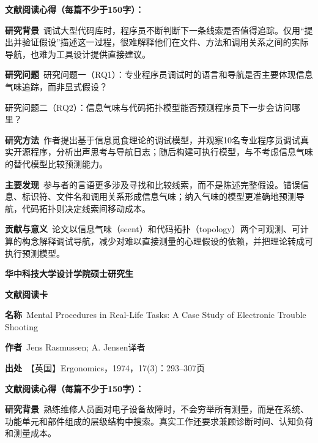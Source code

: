 \vspace{0.35em}
\noindent\textbf{文献阅读心得（每篇不少于150字）：}\par
\noindent\textbf{研究背景}\ 调试大型代码库时，程序员不断判断下一条线索是否值得追踪。仅用“提出并验证假设”描述这一过程，很难解释他们在文件、方法和调用关系之间的实际导航，也难为工具设计提供直接建议。\par
\noindent\textbf{研究问题}\ 研究问题一（RQ1）：专业程序员调试时的语言和导航是否主要体现信息气味追踪，而非显式假设？\par
研究问题二（RQ2）：信息气味与代码拓扑模型能否预测程序员下一步会访问哪里？\par
\noindent\textbf{研究方法}\ 作者提出基于信息觅食理论的调试模型，并观察10名专业程序员调试真实开源程序，分析出声思考与导航日志；随后构建可执行模型，与不考虑信息气味的替代模型比较预测能力。\par
\noindent\textbf{主要发现}\ 参与者的言语更多涉及寻找和比较线索，而不是陈述完整假设。错误信息、标识符、文件名和调用关系形成信息气味；纳入气味的模型更准确地预测导航，代码拓扑则决定线索间移动成本。\par
\noindent\textbf{贡献与意义}\ 论文以信息气味（scent）和代码拓扑（topology）两个可观测、可计算的构念解释调试导航，减少对难以直接测量的心理假设的依赖，并把理论转成可执行预测模型。\par
\clearpage
\begin{center}
{\songti\bfseries\fontsize{18.5pt}{27.75pt}\selectfont 华中科技大学设计学院硕士研究生\par}
{\songti\bfseries\fontsize{18.5pt}{27.75pt}\selectfont 文献阅读卡\par}
\end{center}
\vspace{0.25em}
\noindent\underline{}\par
\vspace{0.35em}
\noindent\textbf{名称}\ Mental Procedures in Real-Life Tasks: A Case Study of Electronic Trouble Shooting\par
\noindent\textbf{作者}\ Jens Rasmussen; A. Jensen\quad 译者\par
\noindent\textbf{出处}\ 【英国】Ergonomics，1974，17(3)：293–307\quad 页\par
\vspace{0.35em}
\noindent\textbf{文献阅读心得（每篇不少于150字）：}\par
\noindent\textbf{研究背景}\ 熟练维修人员面对电子设备故障时，不会穷举所有测量，而是在系统、功能单元和部件组成的层级结构中搜索。真实工作还要求兼顾诊断时间、认知负荷和测量成本。\par
